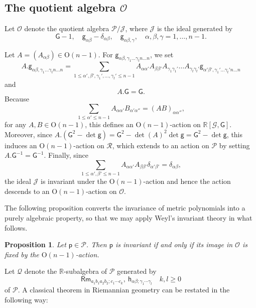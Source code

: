 \documentclass[11pt]{amsart}
\newcommand{\Ogroup}[1]{\mathrm O({#1})}
\newtheorem{proposition}[theorem]{Proposition}
\theoremstyle{definition}
\numberwithin{equation}{section}
\begin{document}
\subsection{The quotient algebra $\mathcal O$}
Let $\mathcal O$ denote the quotient algebra $\mathcal P/\mathcal J$, where $\mathcal J$ is the ideal generated by
\begin{equation}\label{eq: kernel of P to O}
    \mathsf G-1,\quad\mathsf g_{\alpha\beta}-\delta_{\alpha\beta},\quad \mathsf g_{\alpha\beta,\gamma},\quad \alpha,\beta,\gamma = 1,\dots,n-1.
\end{equation}

Let $A = (A_{\alpha\beta})\in\Ogroup{n-1}$. For $\mathsf g_{\alpha\beta,\gamma_1\dots\gamma_tn\dots n}$,  we set 
\[A.\mathsf g_{\alpha\beta,\gamma_1\dots\gamma_tn\dots n}  = \sum_{1\le\alpha',\beta',\gamma_1',\dots,\gamma_t'\le n-1} A_{\alpha\alpha'}A_{\beta\beta'}A_{\gamma_1\gamma_1'}\dots A_{\gamma_t\gamma_t'}\mathsf g_{\alpha'\beta',\gamma_1'\dots\gamma_t'n\dots n}\]
and
\[A.\mathsf G = \mathsf G.\]
Because
\[\sum_{1\le\alpha'\le n-1} A_{\alpha\alpha'} B_{\alpha'\alpha''} =  (AB)_{\alpha\alpha''},\]
for any $A, B\in\Ogroup{n-1}$, this defines an $\Ogroup{n-1}$-action on 
$\mathbb R[\mathcal G,\mathsf G]$. Moreover, since $A.(\mathsf G^2 - \det\mathsf g) = \mathsf G^2 - \det(A)^2\det\mathsf g = \mathsf G^2 - \det\mathsf g$, this induces an $\Ogroup{n-1}$-action on $\mathcal R$, which extends to an action on $\mathcal P$ by setting $A.\mathsf G^{-1} = \mathsf G^{-1}$. Finally, since
\[\sum_{1\le\alpha',\beta'\le n-1}A_{\alpha\alpha'}A_{\beta\beta'}\delta_{\alpha'\beta'} = \delta_{\alpha\beta},\]
the ideal $\mathcal J$ is invariant under the $\Ogroup{n-1}$-action and hence the action descends to an $\Ogroup{n-1}$-action on $\mathcal O$.


The following proposition converts the invariance of metric polynomials into a purely algebraic property, so that we may apply  Weyl's invariant theory \cite{weyl1997classical} in what follows.
\begin{proposition}
    \label{prop: evaluation invariance is algebraic invariance}
    Let $\mathsf p\in\mathcal P$. Then $\mathsf p$ is invariant if and only if its image in $\mathcal O$ is fixed by the $\Ogroup{n-1}$-action.
\end{proposition}
Let $\mathcal Q$ denote the $\mathbb R$-subalgebra of $\mathcal P$ generated by
\[\mathsf{Rm}_{a_1b_1a_2b_2;c_1\cdots c_k},\ \mathsf h_{\alpha\beta;\gamma_1\cdots \gamma_l}\quad k, l\ge 0\]
of $\mathcal P$. A classical theorem in Riemannian geometry can be restated in the following way:
\end{document}
